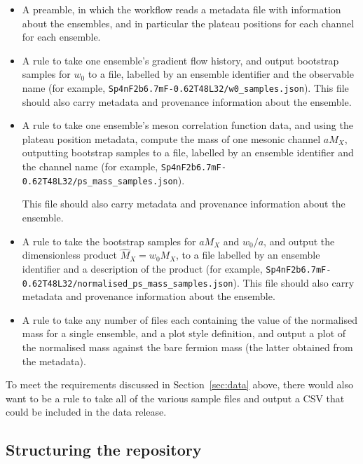 \documentclass{article}
\begin{document}
\begin{itemize}
  \item
        A preamble,
        in which the workflow reads a metadata file with information about the ensembles,
        and in particular the plateau positions for each channel for each ensemble.
  \item
        A rule to take one ensemble's gradient flow history,
        and output bootstrap samples for $w_{0}$ to a file,
        labelled by an ensemble identifier and the observable name
        (for example,
        \texttt{Sp4nF2b6.7mF-0.62T48L32/\hspace{0pt}w0\_samples.json}).
        This file should also carry metadata and provenance information about the ensemble.
  \item
        A rule to take one ensemble's meson correlation function data,
        and using the plateau position metadata,
        compute the mass of one mesonic channel $aM_{X}$,
        outputting bootstrap samples to a file,
        labelled by an ensemble identifier and the channel name
        (for example,
        \texttt{Sp4nF2b6.7mF-0.62T48L32/\hspace{0pt}ps\_mass\_samples.json}).

        This file should also carry metadata and provenance information about the ensemble.
  \item
        A rule to take the bootstrap samples for $aM_{X}$ and $w_{0}/a$,
        and output the dimensionless product $\hat{M}_{X}=w_{0}M_{X}$,
        to a file labelled by an ensemble identifier and a description of the product
        (for example,
        \texttt{Sp4nF2b6.7mF-0.62T48L32/\hspace{0pt}normalised\_ps\_mass\_samples.json}).
        This file should also carry metadata and provenance information about the ensemble.
  \item
        A rule to take any number of files
        each containing the value of the normalised mass for a single ensemble,
        and a plot style definition,
        and output a plot of the normalised mass against the bare fermion mass
        (the latter obtained from the metadata).
\end{itemize}

To meet the requirements discussed in Section~\ref{sec:data} above,
there would also want to be a rule to take all of the various sample files
and output a CSV that could be included in the data release.

\subsection{Structuring the repository}\label{sec:repository-structure}
\end{document}
